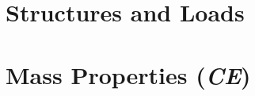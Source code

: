 \documentclass[conf]{new-aiaa}
\begin{document}
\doublespacing

\clearpage
\section{Structures and Loads}
\label{section: Structures and Loads}


\clearpage
\section{Mass Properties (\textit{CE})}
\label{section: Mass Properties}



\clearpage
\label{section: Requirements}


\newpage

\end{document}
